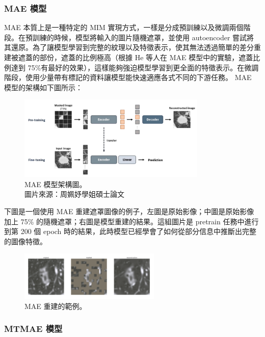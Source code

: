 \documentclass[12pt,a4paper]{article}
\begin{document}
\newpage
\subsubsection{MAE 模型}

MAE 本質上是一種特定的 MIM 實現方式，一樣是分成預訓練以及微調兩個階段。在預訓練的時候，模型將輸入的圖片隨機遮罩，並使用 autoencoder 嘗試將其還原。為了讓模型學習到完整的紋理以及特徵表示，使其無法透過簡單的差分重建被遮蓋的部份，遮蓋的比例極高（根據 He 等人在 MAE 模型中的實驗，遮蓋比例達到 75\%有最好的效果），這樣能夠強迫模型學習到更全面的特徵表示。在微調階段，使用少量帶有標記的資料讓模型能快速適應各式不同的下游任務。
MAE 模型的架構如下圖所示：

\begin{figure}[H]
  \centering
  \includegraphics[width=0.8\textwidth]{src/MAE.png}
  \centering
  \caption{MAE 模型架構圖。\\圖片來源：周姵妤學姐碩士論文}
  \label{fig:MAE-architecture}
\end{figure}

下圖是一個使用 MAE 重建遮罩圖像的例子，左圖是原始影像；中圖是原始影像加上 75\% 的隨機遮罩；右圖是模型重建的結果。這組圖片是 pretrain 任務中進行到第 200 個 epoch 時的結果，此時模型已經學會了如何從部分信息中推斷出完整的圖像特徵。

\begin{figure}[H]
  \centering
  \includegraphics[width=0.6\textwidth]{src/MAE_example.png}
  \centering
  \caption{MAE 重建的範例。}
  \label{fig:MAE_example-architecture}
\end{figure}

\newpage
\subsubsection{MTMAE 模型}
\end{document}
